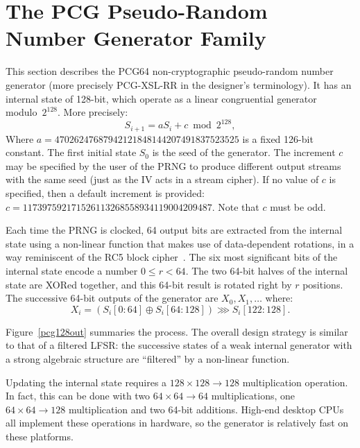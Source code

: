 \documentclass[submission,svgnames,journal=tosc]{iacrtrans}
\begin{document}
\section{The PCG Pseudo-Random Number Generator Family}

This section describes the \textsf{PCG64} non-cryptographic pseudo-random number
generator (more precisely \textsf{PCG-XSL-RR} in the designer's terminology). It
has an internal state of 128-bit, which operate as a linear congruential
generator modulo~$2^{128}$. More precisely:
\[
  S_{i+1} = a S_i + c \bmod 2^{128},
\]
Where $a = 47026247687942121848144207491837523525$ is a fixed 126-bit
constant. The first initial state $S_0$ is the seed of the generator. The
increment $c$ may be specified by the user of the PRNG to produce different
output streams with the same seed (just as the IV acts in a stream cipher). If
no value of $c$ is specified, then a default increment is provided:
$c = 117397592171526113268558934119004209487$. Note that $c$ must be odd.

Each time the PRNG is clocked, 64 output bits are extracted from the internal
state using a non-linear function that makes use of data-dependent rotations, in
a way reminiscent of the \textsf{RC5} block cipher~\cite{Rivest94}. The six most
significant bits of the internal state encode a number $0 \leq r < 64$. The two
64-bit halves of the internal state are XORed together, and this 64-bit result
is rotated right by $r$ positions. The successive 64-bit outputs of the
generator are $X_0, X_1, \dots$ where:
\begin{equation}\label{eq:output}
  X_i =(S_i[0:64] \oplus S_i[64:128]) \ggg S_i[122:128].
\end{equation}

Figure~\ref{pcg128out} summaries the process. The overall design strategy is
similar to that of a filtered LFSR: the successive states of a weak internal
generator with a strong algebraic structure are ``filtered'' by a non-linear
function.

Updating the internal state requires a $128 \times 128 \rightarrow 128$
multiplication operation. In fact, this can be done with two
$64 \times 64 \rightarrow 64$ multiplications, one
$64 \times 64 \rightarrow 128$ multiplication and two 64-bit additions. High-end
desktop CPUs all implement these operations in hardware, so the generator is
relatively fast on these platforms.
\end{document}
